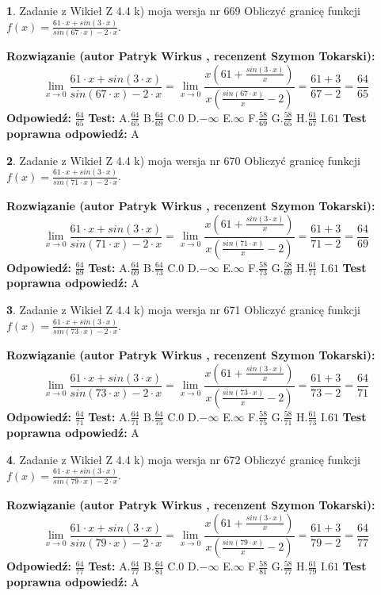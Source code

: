 \documentclass[12pt, a4paper]{article}
\theoremstyle{definition} %
\newtheorem{zad}{}
\newcommand{\zadStart}[1]{\begin{zad}#1\newline}
\newcommand{\zadStop}{\end{zad}}
\newcommand{\rozwStart}[2]{\noindent \textbf{Rozwiązanie (autor #1 , recenzent #2): }\newline}
\newcommand{\rozwStop}{\newline}
\newcommand{\odpStart}{\noindent \textbf{Odpowiedź:}\newline}
\newcommand{\odpStop}{\newline}
\newcommand{\testStart}{\noindent \textbf{Test:}\newline}
\newcommand{\testStop}{\newline}
\newcommand{\kluczStart}{\noindent \textbf{Test poprawna odpowiedź:}\newline}
\newcommand{\kluczStop}{\newline}
\begin{document}
\zadStart{Zadanie z Wikieł Z 4.4 k) moja wersja nr 669}
Obliczyć granicę funkcji $f(x)=\frac{61\cdot x +sin(3\cdot x)}{sin(67\cdot x) -2\cdot x}$.
\zadStop
\rozwStart{Patryk Wirkus}{Szymon Tokarski}
$$\lim\limits_{x\to 0}\frac{61\cdot x +sin(3\cdot x)}{sin(67\cdot x) -2\cdot x}
=\lim\limits_{x\to 0}\frac{x(61+\frac{sin(3\cdot x)}{x})}{x(\frac{sin(67\cdot x)}{x}-2)}
=\frac{61+3}{67-2} = \frac{64}{65}$$
\rozwStop
\odpStart
$\frac{64}{65}$
\odpStop
\testStart
A.$\frac{64}{65}$
B.$\frac{64}{69}$
C.$0$
D.$-\infty$
E.$\infty$
F.$\frac{58}{69}$
G.$\frac{58}{65}$
H.$\frac{61}{67}$
I.$61$
\testStop
\kluczStart
A
\kluczStop



\zadStart{Zadanie z Wikieł Z 4.4 k) moja wersja nr 670}
Obliczyć granicę funkcji $f(x)=\frac{61\cdot x +sin(3\cdot x)}{sin(71\cdot x) -2\cdot x}$.
\zadStop
\rozwStart{Patryk Wirkus}{Szymon Tokarski}
$$\lim\limits_{x\to 0}\frac{61\cdot x +sin(3\cdot x)}{sin(71\cdot x) -2\cdot x}
=\lim\limits_{x\to 0}\frac{x(61+\frac{sin(3\cdot x)}{x})}{x(\frac{sin(71\cdot x)}{x}-2)}
=\frac{61+3}{71-2} = \frac{64}{69}$$
\rozwStop
\odpStart
$\frac{64}{69}$
\odpStop
\testStart
A.$\frac{64}{69}$
B.$\frac{64}{73}$
C.$0$
D.$-\infty$
E.$\infty$
F.$\frac{58}{73}$
G.$\frac{58}{69}$
H.$\frac{61}{71}$
I.$61$
\testStop
\kluczStart
A
\kluczStop



\zadStart{Zadanie z Wikieł Z 4.4 k) moja wersja nr 671}
Obliczyć granicę funkcji $f(x)=\frac{61\cdot x +sin(3\cdot x)}{sin(73\cdot x) -2\cdot x}$.
\zadStop
\rozwStart{Patryk Wirkus}{Szymon Tokarski}
$$\lim\limits_{x\to 0}\frac{61\cdot x +sin(3\cdot x)}{sin(73\cdot x) -2\cdot x}
=\lim\limits_{x\to 0}\frac{x(61+\frac{sin(3\cdot x)}{x})}{x(\frac{sin(73\cdot x)}{x}-2)}
=\frac{61+3}{73-2} = \frac{64}{71}$$
\rozwStop
\odpStart
$\frac{64}{71}$
\odpStop
\testStart
A.$\frac{64}{71}$
B.$\frac{64}{75}$
C.$0$
D.$-\infty$
E.$\infty$
F.$\frac{58}{75}$
G.$\frac{58}{71}$
H.$\frac{61}{73}$
I.$61$
\testStop
\kluczStart
A
\kluczStop



\zadStart{Zadanie z Wikieł Z 4.4 k) moja wersja nr 672}
Obliczyć granicę funkcji $f(x)=\frac{61\cdot x +sin(3\cdot x)}{sin(79\cdot x) -2\cdot x}$.
\zadStop
\rozwStart{Patryk Wirkus}{Szymon Tokarski}
$$\lim\limits_{x\to 0}\frac{61\cdot x +sin(3\cdot x)}{sin(79\cdot x) -2\cdot x}
=\lim\limits_{x\to 0}\frac{x(61+\frac{sin(3\cdot x)}{x})}{x(\frac{sin(79\cdot x)}{x}-2)}
=\frac{61+3}{79-2} = \frac{64}{77}$$
\rozwStop
\odpStart
$\frac{64}{77}$
\odpStop
\testStart
A.$\frac{64}{77}$
B.$\frac{64}{81}$
C.$0$
D.$-\infty$
E.$\infty$
F.$\frac{58}{81}$
G.$\frac{58}{77}$
H.$\frac{61}{79}$
I.$61$
\testStop
\kluczStart
A
\kluczStop
\end{document}
